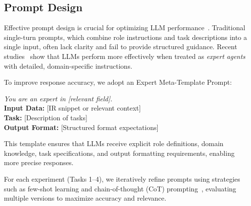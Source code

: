 \subsection{Prompt Design}
\label{subsec:prompt_design}

Effective prompt design is crucial for optimizing LLM performance~\cite{liu22csur}. Traditional single-turn prompts, which combine role instructions and task descriptions into a single input, often lack clarity and fail to provide structured guidance. Recent studies~\cite{prompt, experprompt} show that LLMs perform more effectively when treated as \emph{expert agents} with detailed, domain-specific instructions.

To improve response accuracy, we adopt an Expert Meta-Template Prompt:
\begin{prompt}
    \textit{You are an expert in [relevant field].} \\
    \textbf{Input Data:} [IR snippet or relevant context] \\  
    \textbf{Task:} [Description of tasks] \\  
    \textbf{Output Format:} [Structured format expectations]
\end{prompt}

This template ensures that LLMs receive explicit role definitions, domain knowledge, task specifications, and output formatting requirements, enabling more precise responses.

For each experiment (Tasks 1–4), we iteratively refine prompts using strategies such as few-shot learning and chain-of-thought (CoT) prompting~\cite{chain_of_thought_prompt}, evaluating multiple versions to maximize accuracy and relevance.
